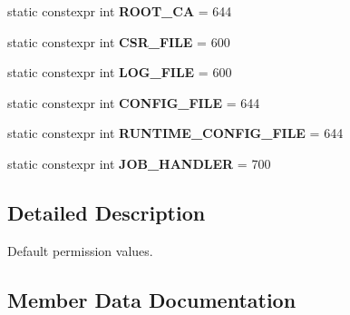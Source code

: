 \begin{DoxyCompactItemize}
static constexpr int {\bfseries R\+O\+O\+T\+\_\+\+CA} = 644
\item 
\mbox{\label{struct_aws_1_1_iot_1_1_device_client_1_1_permissions_ab4af3fdedbcd1eb386b9fc9f56456e45}} 
static constexpr int {\bfseries C\+S\+R\+\_\+\+F\+I\+LE} = 600
\item 
\mbox{\label{struct_aws_1_1_iot_1_1_device_client_1_1_permissions_a8b468c6eadedd2fc64ba8f035714d2eb}} 
static constexpr int {\bfseries L\+O\+G\+\_\+\+F\+I\+LE} = 600
\item 
\mbox{\label{struct_aws_1_1_iot_1_1_device_client_1_1_permissions_a6396e74ab8da5ece4084e5f6091e8cd8}} 
static constexpr int {\bfseries C\+O\+N\+F\+I\+G\+\_\+\+F\+I\+LE} = 644
\item 
\mbox{\label{struct_aws_1_1_iot_1_1_device_client_1_1_permissions_a5cd658463f881a911d48f6e13b59fd49}} 
static constexpr int {\bfseries R\+U\+N\+T\+I\+M\+E\+\_\+\+C\+O\+N\+F\+I\+G\+\_\+\+F\+I\+LE} = 644
\item 
\mbox{\label{struct_aws_1_1_iot_1_1_device_client_1_1_permissions_a5158b0e8eec45c611b1a87103cb00e7e}} 
static constexpr int {\bfseries J\+O\+B\+\_\+\+H\+A\+N\+D\+L\+ER} = 700
\end{DoxyCompactItemize}


\subsection{Detailed Description}
Default permission values. 

\subsection{Member Data Documentation}
\mbox{\label{struct_aws_1_1_iot_1_1_device_client_1_1_permissions_a91a4546e90e87d71b3881b792cf33fe1}} 
